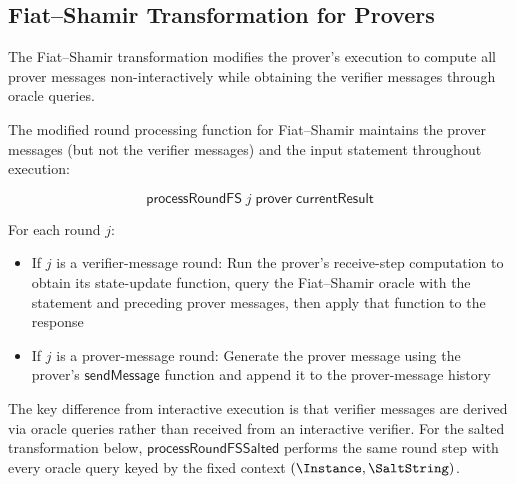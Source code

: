 \subsection{Fiat--Shamir Transformation for Provers}\label{sec:fiat_shamir_prover}

The Fiat--Shamir transformation modifies the prover's execution to compute all prover messages non-interactively while obtaining the verifier messages through oracle queries.

\begin{definition}
    \label{def:prover_process_round_fs}
    The modified round processing function for Fiat--Shamir maintains the prover messages (but not the verifier messages) and the input statement throughout execution:

    \begin{equation*} \mathsf{processRoundFS} \;j \;\mathsf{prover} \;\mathsf{currentResult} \end{equation*}

    For each round \(j\):
    \begin{itemize}
        \item If \(j\) is a verifier-message round: Run the prover's receive-step computation to obtain its state-update function, query the Fiat--Shamir oracle with the statement and preceding prover messages, then apply that function to the response
        \item If \(j\) is a prover-message round: Generate the prover message using the prover's \(\mathsf{sendMessage}\) function and append it to the prover-message history
    \end{itemize}

    The key difference from interactive execution is that verifier messages are derived via oracle queries rather than received from an interactive verifier.
    For the salted transformation below, \(\mathsf{processRoundFSSalted}\) performs the same
    round step with every oracle query keyed by the fixed context \((\Instance,\SaltString)\).
\end{definition}

